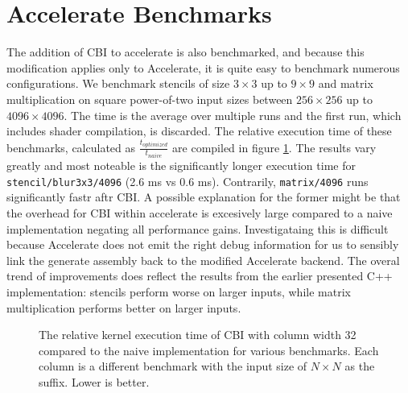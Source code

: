 \section{Accelerate Benchmarks}
\label{sec:accelerate_benchmark}
The addition of CBI to accelerate is also benchmarked, and because this modification applies only to Accelerate, it is quite easy to benchmark numerous configurations.
We benchmark stencils of size $3\times 3$ up to $9\times 9$ and matrix multiplication on square power-of-two input sizes between $256\times 256$ up to $4096\times 4096$.
The time is the average over multiple runs and the first run, which includes shader compilation, is discarded.
The relative execution time of these benchmarks, calculated as $\frac{t_{optimized}}{t_{naive}}$ are compiled in figure \ref{fig:results_accelerate}.
The results vary greatly and most noteable is the significantly longer execution time for \texttt{stencil/blur3x3/4096} (2.6 ms vs 0.6 ms). Contrarily, \texttt{matrix/4096} runs significantly fastr aftr CBI.
A possible explanation for the former might be that the overhead for CBI within accelerate is excesively large compared to a naive implementation negating all performance gains.
Investigataing this is difficult because Accelerate does not emit the right debug information for us to sensibly link the generate assembly back to the modified Accelerate backend.
The overal trend of improvements does reflect the results from the earlier presented C++ implementation: stencils perform worse on larger inputs, while matrix multiplication performs better on larger inputs.

\begin{figure}[H]
    \centering
    \datatable
    \caption{
        The relative kernel execution time of CBI with column width 32 compared to the naive implementation for various benchmarks.
        Each column is a different benchmark with the input size of $N\times N$ as the suffix.
        Lower is better.
    }
    \label{fig:results_accelerate}
\end{figure}
